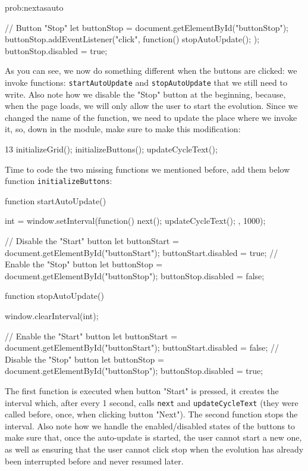\begin{sol}{prob:nextasauto}
\begin{code}
{  // Button "Stop"
  let buttonStop = document.getElementById("buttonStop");
  buttonStop.addEventListener("click", function(){
    stopAutoUpdate();
  });
  buttonStop.disabled = true;
}
\end{code}
As you can see, we now do something different when the buttons are clicked: we invoke functions: 
\texttt{startAutoUpdate} and \texttt{stopAutoUpdate} that we still need to write. Also note how we
disable the "Stop" button at the beginning, because, when the page loads, we will only allow the user
to start the evolution.
Since we changed the name of the function, we need to update the place where we invoke it, so, down in the module,
make sure to make this modification:
\begin{codeh1}{1}{3}
initializeGrid();
initializeButtons();
updateCycleText();
\end{codeh1}
Time to code the two missing functions we mentioned before, add them below function \texttt{initializeButtons}:
\begin{code}
function startAutoUpdate() {
  int = window.setInterval(function(){
    next();
    updateCycleText();
  }, 1000);

  // Disable the "Start" button
  let buttonStart = document.getElementById("buttonStart");
  buttonStart.disabled = true;
  // Enable the "Stop" button
  let buttonStop = document.getElementById("buttonStop");
  buttonStop.disabled = false;
}

function stopAutoUpdate() {
  window.clearInterval(int);

  // Enable the "Start" button
  let buttonStart = document.getElementById("buttonStart");
  buttonStart.disabled = false;
  // Disable the "Stop" button
  let buttonStop = document.getElementById("buttonStop");
  buttonStop.disabled = true;
}
\end{code}
The first function is executed when button "Start" is pressed, it creates the interval which, after every 1 second,
calls \texttt{next} and \texttt{updateCycleText} (they were called before, once, when clicking button "Next").
The second function stops the interval. Also note how we handle the enabled/disabled states of the buttons to make
sure that, once the auto-update is started, the user cannot start a new one, as well as ensuring that the user
cannot click stop when the evolution has already been interrupted before and never resumed later.
\end{sol}


